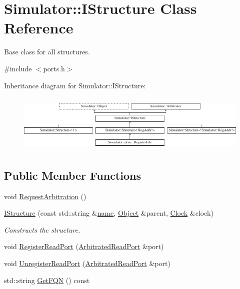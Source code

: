 \hypertarget{class_simulator_1_1_i_structure}{\section{Simulator\+:\+:I\+Structure Class Reference}
\label{class_simulator_1_1_i_structure}
}


Base class for all structures.  




{\ttfamily \#include $<$ports.\+h$>$}

Inheritance diagram for Simulator\+:\+:I\+Structure\+:\begin{figure}[H]
\begin{center}
\leavevmode
\includegraphics[height=2.849873cm]{class_simulator_1_1_i_structure}
\end{center}
\end{figure}
\subsection*{Public Member Functions}
\begin{DoxyCompactItemize}
\item 
void \hyperlink{class_simulator_1_1_i_structure_acd894fd5a5b02d8b761e6662ee273568}{Request\+Arbitration} ()
\item 
\hyperlink{class_simulator_1_1_i_structure_aacc76ecbb5919e67e7eab2945755baee}{I\+Structure} (const std\+::string \&\hyperlink{mtconf_8c_a8f8f80d37794cde9472343e4487ba3eb}{name}, \hyperlink{class_simulator_1_1_object}{Object} \&parent, \hyperlink{class_simulator_1_1_clock}{Clock} \&clock)
\begin{DoxyCompactList}\small\item\em Constructs the structure. \end{DoxyCompactList}\item 
void \hyperlink{class_simulator_1_1_i_structure_a6d9880a8bb84047caead1c3705f2348f}{Register\+Read\+Port} (\hyperlink{class_simulator_1_1_arbitrated_read_port}{Arbitrated\+Read\+Port} \&port)
\item 
void \hyperlink{class_simulator_1_1_i_structure_a603f33493b3f81c1e105bd78c7f12a75}{Unregister\+Read\+Port} (\hyperlink{class_simulator_1_1_arbitrated_read_port}{Arbitrated\+Read\+Port} \&port)
\item 
std\+::string \hyperlink{class_simulator_1_1_i_structure_a54b5688c43dbe1b361d5e11705132fff}{Get\+F\+Q\+N} () const 
\end{DoxyCompactItemize}
